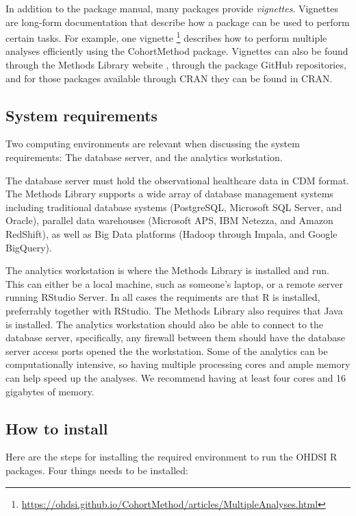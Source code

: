 \documentclass[11pt]{book}
\let\rmarkdownfootnote\footnote%
\def\footnote{\protect\rmarkdownfootnote}
\theoremstyle{definition}
\theoremstyle{definition}
\theoremstyle{definition}
\theoremstyle{remark}
\begin{document}
In addition to the package manual, many packages provide \emph{vignettes}. Vignettes are long-form documentation that describe how a package can be used to perform certain tasks. For example, one vignette \footnote{\url{https://ohdsi.github.io/CohortMethod/articles/MultipleAnalyses.html}} describes how to perform multiple analyses efficiently using the CohortMethod package. Vignettes can also be found through the Methods Library website , through the package GitHub repositories, and for those packages available through CRAN they can be found in CRAN.

\hypertarget{system-requirements-1}{%
\subsection{System requirements}\label{system-requirements-1}}

Two computing environments are relevant when discussing the system requirements: The database server, and the analytics workstation.

The database server must hold the observational healthcare data in CDM format. The Methods Library supports a wide array of database management systems including traditional database systems (PostgreSQL, Microsoft SQL Server, and Oracle), parallel data warehouses (Microsoft APS, IBM Netezza, and Amazon RedShift), as well as Big Data platforms (Hadoop through Impala, and Google BigQuery).

The analytics workstation is where the Methods Library is installed and run. This can either be a local machine, such as someone's laptop, or a remote server running RStudio Server. In all cases the requiments are that R is installed, preferrably together with RStudio. The Methods Library also requires that Java is installed. The analytics workstation should also be able to connect to the database server, specifically, any firewall between them should have the database server access ports opened the the workstation. Some of the analytics can be computationally intensive, so having multiple processing cores and ample memory can help speed up the analyses. We recommend having at least four cores and 16 gigabytes of memory.

\hypertarget{installR}{%
\subsection{How to install}\label{installR}}

Here are the steps for installing the required environment to run the OHDSI R packages. Four things needs to be installed:
\end{document}
